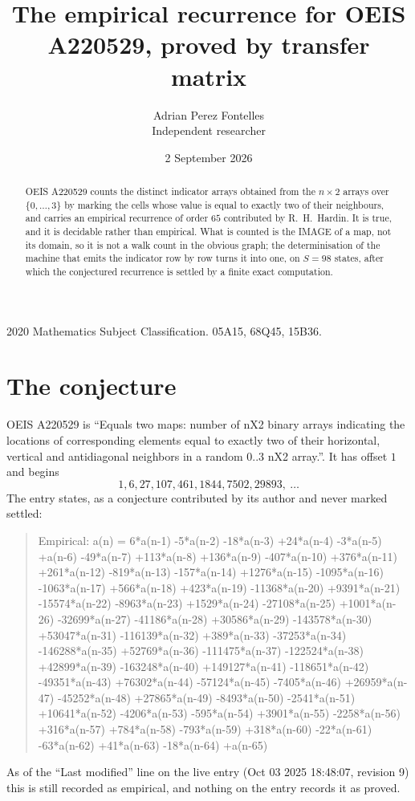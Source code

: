 \documentclass[11pt,a4paper]{article}
\title{The empirical recurrence for OEIS A220529, proved by transfer matrix}
\author{Adrian Perez Fontelles\\ \small Independent researcher}
\date{2 September 2026}
\theoremstyle{plain}
\theoremstyle{definition}
\begin{document}
\maketitle

\begin{abstract}
OEIS A220529 counts the distinct indicator arrays obtained from the $n\times2$ arrays over
$\{0,\dots,3\}$ by marking the cells whose value is equal to exactly two of their neighbours, and carries an
empirical recurrence of order $65$ contributed by R.~H.~Hardin. It is true, and it is
decidable rather than empirical. What is counted is the IMAGE of a map, not its domain, so it
is not a walk count in the obvious graph; the determinisation of the machine that emits the
indicator row by row turns it into one, on $S=98$ states, after which the conjectured
recurrence is settled by a finite exact computation.
\end{abstract}

\noindent\small 2020 Mathematics Subject Classification. 05A15, 68Q45, 15B36.\normalsize

\section{The conjecture}

OEIS A220529 is ``Equals two maps: number of nX2 binary arrays indicating the locations of corresponding elements equal to exactly two of their horizontal, vertical and antidiagonal neighbors in a random 0..3 nX2 array.''. It has offset $1$ and begins
\[
1, 6, 27, 107, 461, 1844, 7502, 29893,\ \dots
\]
The entry states, as a conjecture contributed by its author and never marked settled:
\begin{quote}
Empirical: a(n) = 6*a(n-1) -5*a(n-2) -18*a(n-3) +24*a(n-4) -3*a(n-5) +a(n-6) -49*a(n-7) +113*a(n-8) +136*a(n-9) -407*a(n-10) +376*a(n-11) +261*a(n-12) -819*a(n-13) -157*a(n-14) +1276*a(n-15) -1095*a(n-16) -1063*a(n-17) +566*a(n-18) +423*a(n-19) -11368*a(n-20) +9391*a(n-21) -15574*a(n-22) -8963*a(n-23) +1529*a(n-24) -27108*a(n-25) +1001*a(n-26) -32699*a(n-27) -41186*a(n-28) +30586*a(n-29) -143578*a(n-30) +53047*a(n-31) -116139*a(n-32) +389*a(n-33) -37253*a(n-34) -146288*a(n-35) +52769*a(n-36) -111475*a(n-37) -122524*a(n-38) +42899*a(n-39) -163248*a(n-40) +149127*a(n-41) -118651*a(n-42) -49351*a(n-43) +76302*a(n-44) -57124*a(n-45) -7405*a(n-46) +26959*a(n-47) -45252*a(n-48) +27865*a(n-49) -8493*a(n-50) -2541*a(n-51) +10641*a(n-52) -4206*a(n-53) -595*a(n-54) +3901*a(n-55) -2258*a(n-56) +316*a(n-57) +784*a(n-58) -793*a(n-59) +318*a(n-60) -22*a(n-61) -63*a(n-62) +41*a(n-63) -18*a(n-64) +a(n-65)
\end{quote}
As of the ``Last modified'' line on the live entry (Oct 03 2025 18:48:07, revision 9) this is still
recorded as empirical, and nothing on the entry records it as proved.
\end{document}
